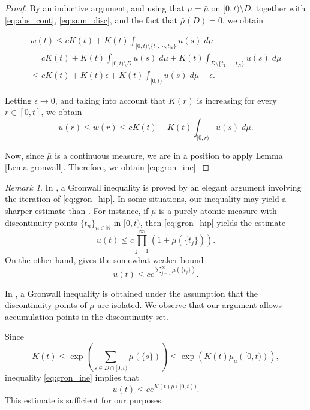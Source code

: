 \documentclass[a4paper,11pt]{amsart}
\theoremstyle{plain}
\theoremstyle{remark}
\newtheorem{obs}[thm]{Remark}
\numberwithin{equation}{section}
\begin{document}
\begin{proof}
By an inductive argument, and using that $\mu=\bar{\mu}$ on $[0,t)\setminus D$, together with \eqref{eq:abs_cont}, \eqref{eq:sum_disc}, and the fact that $\bar{\mu}(D)=0$, we obtain

\begin{multline*}
	w(t)\leq cK(t)+ K(t)\int_{[0,t)\setminus\{t_1,\cdots ,t_N\}}u(s)\;d\mu\\
	= cK(t)+
	K(t)\int_{[0,t)\setminus D} u(s) \;d\mu + K(t)\int_{D\setminus\{t_1,\cdots ,t_N\}}u(s)\;d\mu\\
	\leq
	 cK(t)+ K(t)\epsilon+K(t)\int_{[0,t)}u(s)\;d\bar{\mu}+\epsilon .
\end{multline*}

Letting $\epsilon\to 0$, and taking into account that $K(r)$ is increasing for every $r\in[0,t]$, we obtain
\begin{equation*}
	u(r)\leq w(r)\leq cK(t)+K(t)\int_{[0,r)}u(s)\;d\bar{\mu}.
\end{equation*}

Now, since $\bar{\mu}$ is a continuous measure, we are in a position to apply Lemma \ref{Lema gronwall}. Therefore, we obtain \eqref{eq:gron_ine}.
\end{proof}



\begin{obs}\label{rem:gronwall}
In \cite[Th.~5.1]{StewartN.Ethier1593}, a Gronwall inequality is proved by an elegant argument involving the iteration of \eqref{eq:gron_hip}. In some situations, our inequality may yield a sharper estimate than \cite[Th.~5.1]{StewartN.Ethier1593}. For instance, if $\mu$ is a purely atomic measure with discontinuity points $\{t_n\}_{n\in \mathbb{N}}$ in $[0,t)$, then \eqref{eq:gron_hip} yields the estimate
\[
u(t)\leq c\prod_{j=1}^\infty \left(1+\mu(\{t_j\})\right).
\]
On the other hand, \cite[Th.~5.1]{StewartN.Ethier1593} gives the somewhat weaker bound
\[
u(t)\leq ce^{\sum_{j=1}^\infty \mu(\{t_j\})}.
\]

In \cite[Th.~17.4]{D.D.Bainov1594}, a Gronwall inequality is obtained under the assumption that the discontinuity points of $\mu$ are isolated. We observe that our argument allows accumulation points in the discontinuity set.

Since
\[
K(t)\leq \exp\left(\sum_{s\in D\cap [0,t)}\mu(\{s\})\right)\leq \exp\left(K(t)\mu_{a}\left([0,t)\right)\right),
\]
inequality \eqref{eq:gron_ine} implies that
\begin{equation}\label{eq:gron_ine2}
u(t)\leq ce^{K(t)\mu([0,t))}.
\end{equation}
This estimate is sufficient for our purposes.
 \end{obs}
\end{document}
